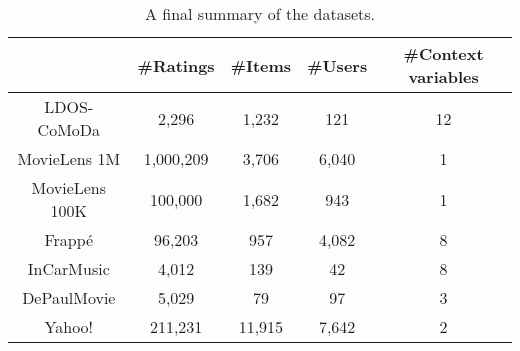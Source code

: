\begin{table*}[]
    \centering
    \begin{tabular}{|c|c|c|c|c|} 
    \hline
               & \#Ratings & \#Items & \#Users & \#Context variables  \\ 
    \hline
    LDOS-CoMoDa    & 2,296      & 1,232    & 121     & 12                   \\ 
    \hline
    MovieLens 1M   & 1,000,209 & 3,706    & 6,040    & 1                    \\ 
    \hline
    MovieLens 100K & 100,000   & 1,682    & 943     & 1                    \\ 
    \hline
    Frappé         & 96,203     & 957     & 4,082    & 8                    \\ 
    \hline
    InCarMusic     & 4,012      & 139     & 42      & 8                    \\ 
    \hline
    DePaulMovie    & 5,029      & 79      & 97      & 3                    \\
    \hline
    Yahoo!    & 211,231      & 11,915      & 7,642      & 2                    \\
    \hline
    \end{tabular}
    \caption{A final summary of the datasets.}
    \label{tab:datasetstats}
\end{table*}
